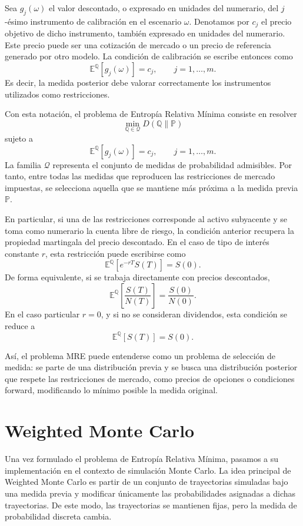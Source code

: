 Sea \(g_j(\omega)\) el valor descontado, o expresado en unidades del numerario, del \(j\)-ésimo instrumento de calibración en el escenario \(\omega\). Denotamos por \(c_j\) el precio objetivo de dicho instrumento, también expresado en unidades del numerario. Este precio puede ser una cotización de mercado o un precio de referencia generado por otro modelo. La condición de calibración se escribe entonces como
\[
\mathbb{E}^{\mathbb{Q}}\left[g_j(\omega)\right]=c_j,
\qquad j=1,\ldots,m.
\]
Es decir, la medida posterior debe valorar correctamente los instrumentos utilizados como restricciones.

Con esta notación, el problema de Entropía Relativa Mínima consiste en resolver
\[
\min_{\mathbb{Q}\in\mathcal{Q}}
D(\mathbb{Q}\|\mathbb{P})
\]
sujeto a
\[
\mathbb{E}^{\mathbb{Q}}\left[g_j(\omega)\right]=c_j,
\qquad j=1,\ldots,m.
\]
La familia \(\mathcal{Q}\) representa el conjunto de medidas de probabilidad admisibles. Por tanto, entre todas las medidas que reproducen las restricciones de mercado impuestas, se selecciona aquella que se mantiene más próxima a la medida previa \(\mathbb{P}\).

En particular, si una de las restricciones corresponde al activo subyacente y se toma como numerario la cuenta libre de riesgo, la condición anterior recupera la propiedad martingala del precio descontado. En el caso de tipo de interés constante \(r\), esta restricción puede escribirse como
\[
\mathbb{E}^{\mathbb{Q}}
\left[
e^{-rT}S(T)
\right]
=
S(0).
\]
De forma equivalente, si se trabaja directamente con precios descontados,
\[
\mathbb{E}^{\mathbb{Q}}
\left[
\frac{S(T)}{N(T)}
\right]
=
\frac{S(0)}{N(0)}.
\]
En el caso particular \(r=0\), y si no se consideran dividendos, esta condición se reduce a
\[
\mathbb{E}^{\mathbb{Q}}\left[S(T)\right]=S(0).
\]

Así, el problema MRE puede entenderse como un problema de selección de medida: se parte de una distribución previa y se busca una distribución posterior que respete las restricciones de mercado, como precios de opciones o condiciones forward, modificando lo mínimo posible la medida original.

\section{Weighted Monte Carlo}

Una vez formulado el problema de Entropía Relativa Mínima, pasamos a su implementación en el contexto de simulación Monte Carlo. La idea principal de Weighted Monte Carlo es partir de un conjunto de trayectorias simuladas bajo una medida previa y modificar únicamente las probabilidades asignadas a dichas trayectorias. De este modo, las trayectorias se mantienen fijas, pero la medida de probabilidad discreta cambia.

